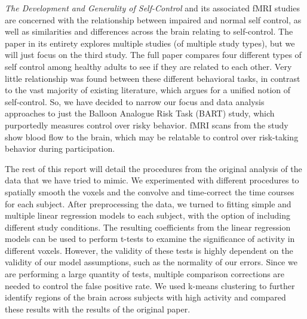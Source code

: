 \par \textit{The Development and Generality of Self-Control} \cite
{CohenSelfControl} and its associated fMRI studies are concerned with the 
relationship between impaired and normal self control, as well as 
similarities and differences across the brain relating to self-control. The 
paper in its entirety explores multiple studies (of multiple study types), 
but we will just focus on the third study. The full paper compares four 
different types of self control among healthy adults to see if they are 
related to each other. Very little relationship was found between these 
different behavioral tasks, in contrast to the vast majority of existing 
literature,  which argues for a unified notion of self-control. So, we have 
decided to narrow our focus and data analysis approaches to just the Balloon 
Analogue Risk Task (BART) study, which purportedly measures control over risky 
behavior. fMRI scans from the study show blood flow to the brain, which may 
be relatable to control over risk-taking behavior during participation.

\par The rest of this report will detail the procedures from the original 
analysis of the data that we have tried to mimic. We experimented with 
different procedures to spatially smooth the voxels and the convolve and 
time-correct the time courses for each subject. After preprocessing the data, we 
turned to fitting simple and multiple linear regression models to each subject, 
with the option of including different study conditions. The resulting 
coefficients from the linear regression models can be used to perform t-tests 
to examine the significance of activity in different voxels. However, the 
validity of these tests is highly dependent on the validity of our model 
assumptions, such as the normality of our errors. Since we are performing a 
large quantity of tests, multiple comparison corrections are needed to control 
the false positive rate. We used k-means clustering to further identify regions 
of the brain across subjects with high activity and compared these results with 
the results of the original paper. 

